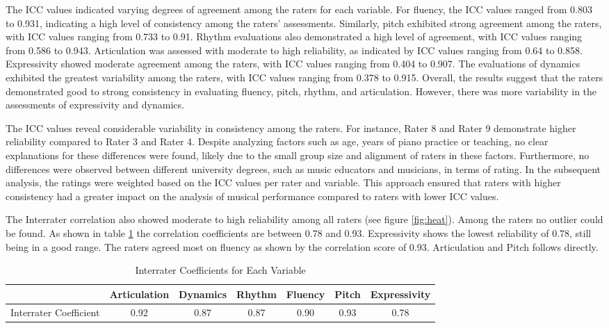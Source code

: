 The ICC values indicated varying degrees of agreement among the raters for each variable. For fluency, the ICC values ranged from 0.803 to 0.931, indicating a high level of consistency among the raters' assessments. Similarly, pitch exhibited strong agreement among the raters, with ICC values ranging from 0.733 to 0.91. Rhythm evaluations also demonstrated a high level of agreement, with ICC values ranging from 0.586 to 0.943. Articulation was assessed with moderate to high reliability, as indicated by ICC values ranging from 0.64 to 0.858. Expressivity showed moderate agreement among the raters, with ICC values ranging from 0.404 to 0.907. The evaluations of dynamics exhibited the greatest variability among the raters, with ICC values ranging from 0.378 to 0.915. Overall, the results suggest that the raters demonstrated good to strong consistency in evaluating fluency, pitch, rhythm, and articulation. However, there was more variability in the assessments of expressivity and dynamics.

The ICC values reveal considerable variability in consistency among the raters. For instance, Rater 8 and Rater 9 demonstrate higher reliability compared to Rater 3 and Rater 4. Despite analyzing factors such as age, years of piano practice or teaching, no clear explanations for these differences were found, likely due to the small group size and alignment of raters in these factors. Furthermore, no differences were observed between different university degrees, such as music educators and musicians, in terms of rating.
In the subsequent analysis, the ratings were weighted based on the ICC values per rater and variable. This approach ensured that raters with higher consistency had a greater impact on the analysis of musical performance compared to raters with lower ICC values.

The Interrater correlation also showed moderate to high reliability among all raters (see figure \ref{fig:heat}). Among the raters no outlier could be found. As shown in table \ref{tab:interrater} the correlation coefficients are between 0.78 and 0.93. Expressivity shows the lowest reliability of 0.78, still being in a good range. The raters agreed most on fluency as shown by the correlation score of 0.93. Articulation and Pitch follows directly. 
\begin{table}[h]
	\centering
	\caption{Interrater Coefficients for Each Variable }
	\label{tab:interrater}
	\renewcommand{\arraystretch}{1.2}
	\vspace{\medskipamount}
	\begin{tabular}{l|cccccc}
		&    Articulation	& Dynamics & Rhythm & Fluency & Pitch & Expressivity     \\
		\hline
		Interrater Coefficient       &  0.92 & 0.87 & 0.87 & 0.90 & 0.93 & 0.78\\
	\end{tabular}\par
	\vspace{\medskipamount}
\end{table}

